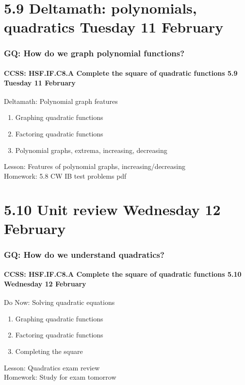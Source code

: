 \documentclass{beamer}
\begin{document}
\section{5.9 Deltamath: polynomials, quadratics \hfill Tuesday 11 February}
  \frame
  {
    \frametitle{GQ: How do we graph polynomial functions?}
    \framesubtitle{CCSS: HSF.IF.C8.A Complete the square of quadratic functions \hfill \alert{5.9 Tuesday 11 February}}

    \begin{block}{Deltamath: Polynomial graph features}
      \begin{enumerate}
        \item Graphing quadratic functions
        \item Factoring quadratic functions
        \item Polynomial graphs, extrema, increasing, decreasing
      \end{enumerate}
      \end{block}
      Lesson: Features of polynomial graphs, increasing/decreasing \\ \smallskip
      Homework: 5.8 CW IB test problems pdf
      }

\section{5.10 Unit review \hfill Wednesday 12 February}
  \frame
  {
    \frametitle{GQ: How do we understand quadratics?}
    \framesubtitle{CCSS: HSF.IF.C8.A Complete the square of quadratic functions \hfill \alert{5.10 Wednesday 12 February}}

    \begin{block}{Do Now: Solving quadratic equations}
      \begin{enumerate}
        \item Graphing quadratic functions
        \item Factoring quadratic functions
        \item Completing the square
      \end{enumerate}
      \end{block}
      Lesson: Quadratics exam review \\ \smallskip
      Homework: Study for \alert{exam tomorrow}
      }
\end{document}
